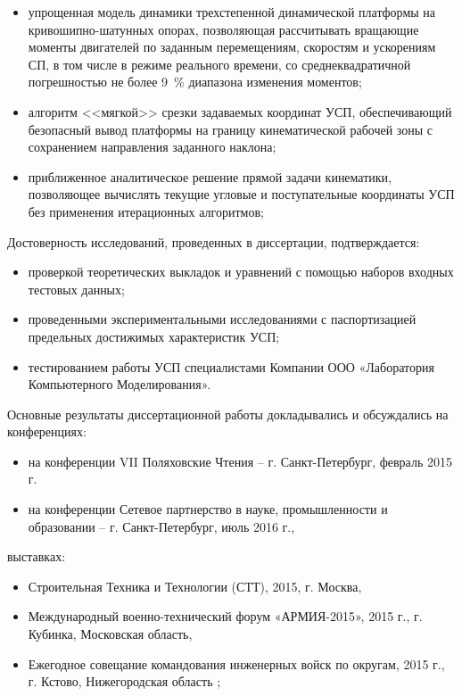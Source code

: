 {}
\begin{itemize}
  \item упрощенная модель динамики трехстепенной динамической платформы на кривошипно-шатунных опорах, позволяющая рассчитывать вращающие моменты двигателей по заданным перемещениям, скоростям и ускорениям СП, в том числе в режиме реального времени, со среднеквадратичной погрешностью не более 9~\% диапазона изменения моментов;
  \item алгоритм <<мягкой>> срезки задаваемых координат УСП, обеспечивающий безопасный вывод платформы на границу кинематической рабочей зоны с сохранением направления заданного наклона;
  \item приближенное аналитическое решение прямой задачи кинематики, позволяющее вычислять текущие угловые и поступательные координаты УСП без применения итерационных алгоритмов;
\end{itemize}

{\reliability} Достоверность исследований, проведенных в диссертации, подтверждается:
\begin{itemize}
	\item проверкой теоретических выкладок и уравнений с помощью наборов входных тестовых данных;
	\item проведенными экспериментальными исследованиями с паспортизацией предельных достижимых характеристик УСП;
	\item тестированием работы УСП специалистами Компании ООО «Лаборатория Компьютерного Моделирования».
\end{itemize}

{\probation}

Основные результаты диссертационной работы докладывались и обсуждались на конференциях:
\begin{itemize}
	\item на конференции VII Поляховские Чтения – г. Санкт-Петербург, февраль 2015 г.
	\item на конференции Сетевое партнерство в науке, промышленности и образовании – г. Санкт-Петербург, июль 2016 г.,
\end{itemize}

выставках:
\begin{itemize}
	\item Строительная Техника и Технологии (СТТ), 2015, г. Москва,
	\item Международный военно-технический форум «АРМИЯ-2015», 2015 г., г. Кубинка, Московская область,
	\item Ежегодное совещание командования инженерных войск по округам, 2015 г., г. Кстово, Нижегородская область ;
\end{itemize}

